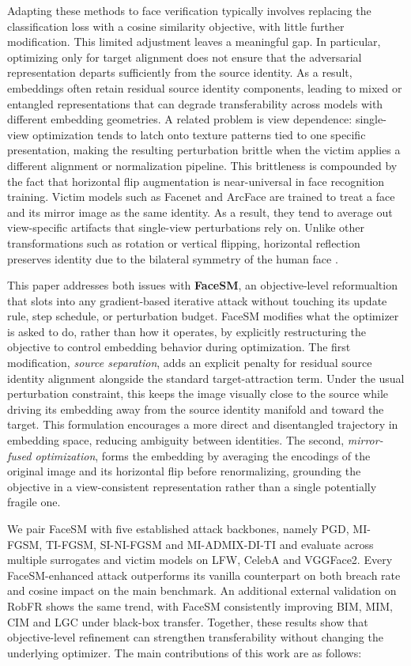 \documentclass[a4paper,fleqn]{cas-dc}
\begin{document}
Adapting these methods to face verification typically involves replacing the classification loss with a cosine similarity objective, with little further modification. This limited adjustment leaves a meaningful gap. In particular, optimizing only for target alignment does not ensure that the adversarial representation departs sufficiently from the source identity. As a result, embeddings often retain residual source identity components, leading to mixed or entangled representations that can degrade transferability across models with different embedding geometries. A related problem is view dependence: single-view optimization tends to latch onto texture patterns tied to one specific presentation, making the resulting perturbation brittle when the victim applies a different alignment or normalization pipeline. This brittleness is compounded by the fact that horizontal flip augmentation is near-universal in face recognition training. Victim models such as Facenet and ArcFace are trained to treat a face and its mirror image as the same identity. As a result, they tend to average out view-specific artifacts that single-view perturbations rely on. Unlike other transformations such as rotation or vertical flipping, horizontal reflection preserves identity due to the bilateral symmetry of the human face \citet{farzmahdi2024emergence}.

This paper addresses both issues with \textbf{FaceSM}, an objective-level reformualtion that slots into any gradient-based iterative attack without touching its update rule, step schedule, or perturbation budget. FaceSM modifies what the optimizer is asked to do, rather than how it operates, by explicitly restructuring the objective to control embedding behavior during optimization. The first modification, \emph{source separation}, adds an explicit penalty for residual source identity alignment alongside the standard target-attraction term. Under the usual perturbation constraint, this keeps the image visually close to the source while driving its embedding away from the source identity manifold and toward the target. This formulation encourages a more direct and disentangled trajectory in embedding space, reducing ambiguity between identities. The second, \emph{mirror-fused optimization}, forms the embedding by averaging the encodings of the original image and its horizontal flip before renormalizing, grounding the objective in a view-consistent representation rather than a single potentially fragile one.

We pair FaceSM with five established attack backbones, namely PGD, MI-FGSM, TI-FGSM, SI-NI-FGSM and MI-ADMIX-DI-TI and evaluate across multiple surrogates and victim models on LFW, CelebA and VGGFace2. Every FaceSM-enhanced attack outperforms its vanilla counterpart on both breach rate and cosine impact on the main benchmark. An additional external validation on RobFR shows the same trend, with FaceSM consistently improving BIM, MIM, CIM and LGC under black-box transfer. Together, these results show that objective-level refinement can strengthen transferability without changing the underlying optimizer. The main contributions of this work are as follows:
\end{document}
